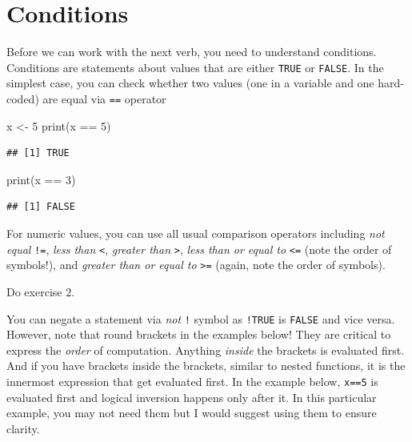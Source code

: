 \documentclass[
]{book}
\newenvironment{Shaded}{\begin{snugshade}}{\end{snugshade}}
\newcommand{\DecValTok}[1]{\textcolor[rgb]{0.00,0.00,0.81}{#1}}
\newcommand{\FunctionTok}[1]{\textcolor[rgb]{0.00,0.00,0.00}{#1}}
\newcommand{\NormalTok}[1]{#1}
\newcommand{\OtherTok}[1]{\textcolor[rgb]{0.56,0.35,0.01}{#1}}
\newcommand{\SpecialCharTok}[1]{\textcolor[rgb]{0.00,0.00,0.00}{#1}}
\begin{document}
\hypertarget{conditions}{%
\section{Conditions}\label{conditions}}

Before we can work with the next verb, you need to understand conditions. Conditions are statements about values that are either \texttt{TRUE} or \texttt{FALSE}. In the simplest case, you can check whether two values (one in a variable and one hard-coded) are equal via \texttt{==} operator

\begin{Shaded}
\begin{Highlighting}[]
\NormalTok{x }\OtherTok{\textless{}{-}} \DecValTok{5}
\FunctionTok{print}\NormalTok{(x }\SpecialCharTok{==} \DecValTok{5}\NormalTok{)}
\end{Highlighting}
\end{Shaded}

\begin{verbatim}
## [1] TRUE
\end{verbatim}

\begin{Shaded}
\begin{Highlighting}[]
\FunctionTok{print}\NormalTok{(x }\SpecialCharTok{==} \DecValTok{3}\NormalTok{)}
\end{Highlighting}
\end{Shaded}

\begin{verbatim}
## [1] FALSE
\end{verbatim}

For numeric values, you can use all usual comparison operators including \emph{not equal} \texttt{!=}, \emph{less than} \texttt{\textless{}}, \emph{greater than} \texttt{\textgreater{}}, \emph{less than or equal to} \texttt{\textless{}=} (note the order of symbols!), and \emph{greater than or equal to} \texttt{\textgreater{}=} (again, note the order of symbols).

Do exercise 2.

You can negate a statement via \emph{not} \texttt{!} symbol as \texttt{!TRUE} is \texttt{FALSE} and vice versa. However, note that round brackets in the examples below! They are critical to express the \emph{order} of computation. Anything \emph{inside} the brackets is evaluated first. And if you have brackets inside the brackets, similar to nested functions, it is the innermost expression that get evaluated first. In the example below, \texttt{x==5} is evaluated first and logical inversion happens only after it. In this particular example, you may not need them but I would suggest using them to ensure clarity.
\end{document}

